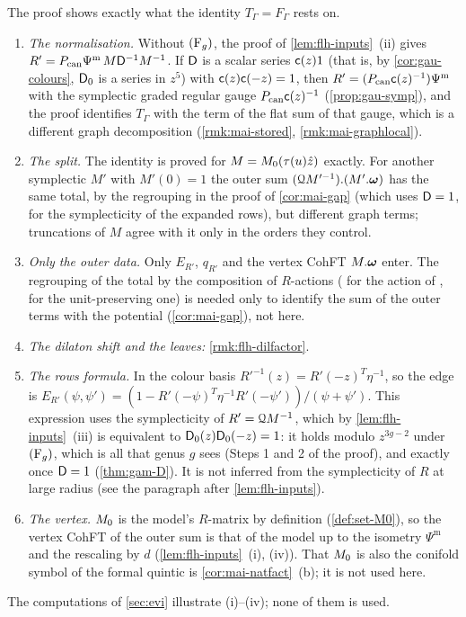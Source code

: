 \begin{rmk}
\label{rmk:flh-fail}
The proof shows exactly what the identity $T_\Gamma=F_\Gamma$ rests on.
\begin{enumerate}
\item \emph{The normalisation.} Without $(\mathrm{F}_{g})$, the proof of \cref{lem:flh-inputs}~(ii) gives $R'=P_{\mathrm{can}}\Psi^{\mathrm m}\,M\mathsf{D}^{-1}M^{-1}$. If $\mathsf{D}$ is a scalar series $\mathsf{c}(z)1$ (that is, by \cref{cor:gau-colours}, $\mathsf{D}_0$ is a series in $z^5$) with $\mathsf{c}(z)\mathsf{c}(-z)=1$, then $R'=(P_{\mathrm{can}}\mathsf{c}(z)^{-1})\Psi^{\mathrm m}$ with the symplectic graded regular gauge $P_{\mathrm{can}}\mathsf{c}(z)^{-1}$ (\cref{prop:gau-symp}), and the proof identifies $T_\Gamma$ with the term of the flat sum of that gauge, which is a different graph decomposition (\cref{rmk:mai-stored}, \cref{rmk:mai-graphlocal}).
\item \emph{The split.} The identity is proved for $M=M_{0}(\tau(u)\hat{z})$ exactly. For another symplectic $M'$ with $M'(0)=1$ the outer sum $(\mathcal{Q} M'^{-1}).(M'.\boldsymbol{\omega})$ has the same total, by the regrouping in the proof of \cref{cor:mai-gap} (which uses $\mathsf{D}=1$, for the symplecticity of the expanded rows), but different graph terms; truncations of $M$ agree with it only in the orders they control.
\item \emph{Only the outer data.} Only $E_{R'}$, $q_{R'}$ and the vertex CohFT $M.\boldsymbol{\omega}$ enter. The regrouping of the total by the composition of $R$-actions (\cite[Prop.~2.4]{PPZ15} for the action of \cite[Def.~2.2]{PPZ15}, \cite[Def.~2.13, Prop.~2.14]{PPZ15} for the unit-preserving one) is needed only to identify the sum of the outer terms with the potential (\cref{cor:mai-gap}), not here.
\item \emph{The dilaton shift and the leaves:} \cref{rmk:flh-dilfactor}.
\item \emph{The rows formula.} In the colour basis $R'^{-1}(z)=R'(-z)^T\eta^{-1}$, so the edge is $E_{R'}(\psi,\psi')=(1-R'(-\psi)^T\eta^{-1}R'(-\psi'))/(\psi+\psi')$. This expression uses the symplecticity of $R'=\mathcal{Q} M^{-1}$, which by \cref{lem:flh-inputs}~(iii) is equivalent to $\mathsf{D}_0(z)\mathsf{D}_0(-z)=1$: it holds modulo $z^{3g-2}$ under $(\mathrm{F}_{g})$, which is all that genus $g$ sees (Steps 1 and 2 of the proof), and exactly once $\mathsf{D}=1$ (\cref{thm:gam-D}). It is not inferred from the symplecticity of $R$ at large radius (see the paragraph after \cref{lem:flh-inputs}).
\item \emph{The vertex.} $M_{0}$ is the model's $R$-matrix by definition (\cref{def:set-M0}), so the vertex CohFT of the outer sum is that of the model up to the isometry $\Psi^{\mathrm m}$ and the rescaling by $d$ (\cref{lem:flh-inputs}~(i), (iv)). That $M_{0}$ is also the conifold symbol of the formal quintic is \cref{cor:mai-natfact}~(b); it is not used here.
\end{enumerate}
The computations of \cref{sec:evi} illustrate (i)--(iv); none of them is used.
\end{rmk}

